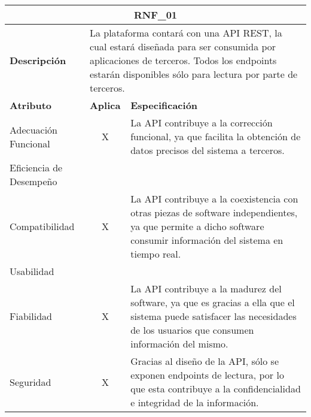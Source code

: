 \begin{center}
  \begin{tabular}{ | p{2cm}| p{8cm} | p{5cm} |}
    \hline
    \multicolumn{3}{|c|}{\textbf{RNF\_01}} \\
    \hline
    
    \multicolumn{1}{|p{2cm}|}{\textbf{Descripción}} & \multicolumn{2}{|p{13cm}|}{La plataforma contará con una API REST, la cual estará diseñada para ser consumida por aplicaciones de terceros. Todos los endpoints estarán disponibles sólo para lectura por parte de terceros.} \\ \hline
    
    \multicolumn{1}{|p{3.5cm}|}{\textbf{{Atributo}}} & \multicolumn{1}{|p{1.5cm}|}{\textbf{Aplica}} & \multicolumn{1}{|p{10cm}|}{\textbf{Especificación}} \\ \hline
    
    \multicolumn{1}{|p{3.5cm}|}{\nohyphens{Adecuación Funcional}} & \multicolumn{1}{|c|}{X} & \multicolumn{1}{|p{10cm}|}{La API contribuye a la corrección funcional, ya que facilita la obtención de datos precisos del sistema a terceros.} \\ \hline
    
    \multicolumn{1}{|p{3.5cm}|}{\nohyphens{Eficiencia de Desempeño}} & \multicolumn{1}{|c|}{} & \multicolumn{1}{|p{10cm}|}{} \\ \hline
    
    \multicolumn{1}{|p{3.5cm}|}{\nohyphens{Compatibilidad}} & \multicolumn{1}{|c|}{X} & \multicolumn{1}{|p{10cm}|}{La API contribuye a la coexistencia con otras piezas de software independientes, ya que permite a dicho software consumir información del sistema en tiempo real.} \\ \hline
    
    \multicolumn{1}{|p{3.5cm}|}{\nohyphens{Usabilidad}} & \multicolumn{1}{|c|}{} & \multicolumn{1}{|p{10cm}|}{} \\ \hline
    
    \multicolumn{1}{|p{3.5cm}|}{\nohyphens{Fiabilidad}} & \multicolumn{1}{|c|}{X} & \multicolumn{1}{|p{10cm}|}{La API contribuye a la madurez del software, ya que es gracias a ella que el sistema puede satisfacer las necesidades de los usuarios que consumen información del mismo.} \\ \hline
    
    \multicolumn{1}{|p{3.5cm}|}{\nohyphens{Seguridad}} & \multicolumn{1}{|c|}{X} & \multicolumn{1}{|p{10cm}|}{Gracias al diseño de la API, sólo se exponen endpoints de lectura, por lo que esta contribuye a la confidencialidad e integridad de la información.} \\ \hline
    

\end{tabular}
\end{center}
